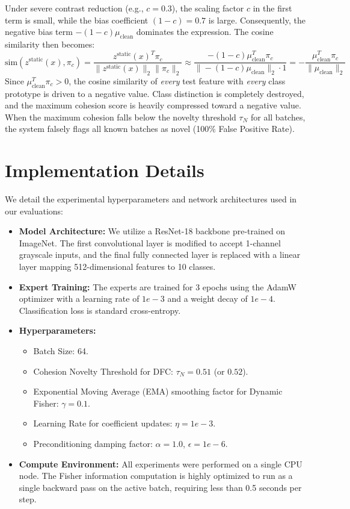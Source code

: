\documentclass{article}
\theoremstyle{plain}
\theoremstyle{definition}
\theoremstyle{remark}
\begin{document}
Under severe contrast reduction (e.g., $c = 0.3$), the scaling factor $c$ in the first term is small, while the bias coefficient $(1 - c) = 0.7$ is large. Consequently, the negative bias term $-(1 - c)\mu_{\text{clean}}$ dominates the expression. 
The cosine similarity then becomes:
\begin{equation}
  \text{sim}(z^{\text{static}}(x), \pi_c) = \frac{z^{\text{static}}(x)^T \pi_c}{\|z^{\text{static}}(x)\|_2 \|\pi_c\|_2} \approx \frac{-(1 - c) \mu_{\text{clean}}^T \pi_c}{\|-(1 - c) \mu_{\text{clean}}\|_2 \cdot 1} = -\frac{\mu_{\text{clean}}^T \pi_c}{\|\mu_{\text{clean}}\|_2}
\end{equation}
Since $\mu_{\text{clean}}^T \pi_c > 0$, the cosine similarity of \emph{every} test feature with \emph{every} class prototype is driven to a negative value. Class distinction is completely destroyed, and the maximum cohesion score is heavily compressed toward a negative value. When the maximum cohesion falls below the novelty threshold $\tau_N$ for all batches, the system falsely flags all known batches as novel (100\% False Positive Rate).

\section{Implementation Details}
We detail the experimental hyperparameters and network architectures used in our evaluations:
\begin{itemize}
  \item \textbf{Model Architecture:} We utilize a ResNet-18 backbone pre-trained on ImageNet. The first convolutional layer is modified to accept 1-channel grayscale inputs, and the final fully connected layer is replaced with a linear layer mapping 512-dimensional features to 10 classes.
  \item \textbf{Expert Training:} The experts are trained for 3 epochs using the AdamW optimizer with a learning rate of $1e-3$ and a weight decay of $1e-4$. Classification loss is standard cross-entropy.
  \item \textbf{Hyperparameters:}
    \begin{itemize}
      \item Batch Size: 64.
      \item Cohesion Novelty Threshold for DFC: $\tau_N = 0.51$ (or $0.52$).
      \item Exponential Moving Average (EMA) smoothing factor for Dynamic Fisher: $\gamma = 0.1$.
      \item Learning Rate for coefficient updates: $\eta = 1e-3$.
      \item Preconditioning damping factor: $\alpha = 1.0$, $\epsilon = 1e-6$.
    \end{itemize}
  \item \textbf{Compute Environment:} All experiments were performed on a single CPU node. The Fisher information computation is highly optimized to run as a single backward pass on the active batch, requiring less than 0.5 seconds per step.
\end{itemize}
\end{document}
